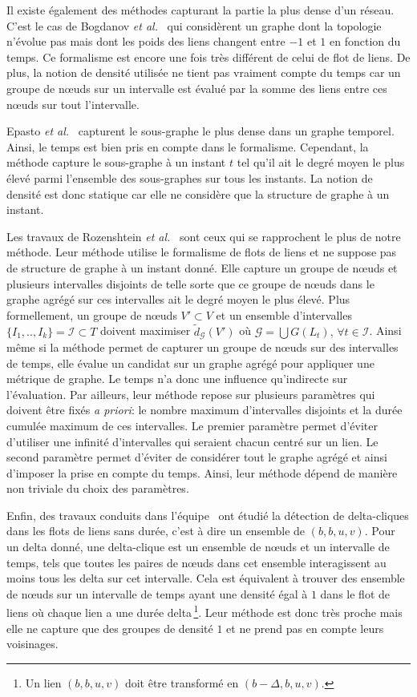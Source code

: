 Il existe également des méthodes capturant la partie la plus dense d'un réseau.
C'est le cas de Bogdanov \emph{et al.}~\cite{Bogdanov2011} qui considèrent un graphe dont la topologie n'évolue pas mais dont les poids des liens changent entre $-1$ et $1$ en fonction du temps.
Ce formalisme est encore une fois très différent de celui de flot de liens.
De plus, la notion de densité utilisée ne tient pas vraiment compte du temps car un groupe de n\oe{}uds sur un intervalle est évalué par la somme des liens entre ces n\oe{}uds sur tout l'intervalle.


Epasto \emph{et al.}~\cite{Epasto2015} capturent le sous-graphe le plus dense dans un graphe temporel.
Ainsi, le temps est bien pris en compte dans le formalisme.
Cependant, la méthode capture le sous-graphe à un instant $t$ tel qu'il ait le degré moyen le plus élevé parmi l'ensemble des sous-graphes sur tous les instants.
La notion de densité est donc statique car elle ne considère que la structure de graphe à un instant.


Les travaux de Rozenshtein \emph{et al.}~\cite{rozenshtein2014} sont ceux qui se rapprochent le plus de notre méthode.
Leur méthode utilise le formalisme de flots de liens et ne suppose pas de structure de graphe à un instant donné.
Elle capture un groupe de n\oe{}uds et plusieurs intervalles disjoints de telle sorte que ce groupe de n\oe{}uds dans le graphe agrégé sur ces intervalles ait le degré moyen le plus élevé.
Plus formellement, un groupe de n\oe{}uds $V'\subset V$ et un ensemble d'intervalles $\{I_1,..,I_k\} = \mathcal{I} \subset T$ doivent maximiser $\tilde{d}_\mathcal{G}(V')$ où $\mathcal{G}= \bigcup G(L_t),\,\forall t \in \mathcal{I}$.
Ainsi même si la méthode permet de capturer un groupe de n\oe{}uds sur des intervalles de temps, elle évalue un candidat sur un graphe agrégé pour appliquer une métrique de graphe.
Le temps n'a donc une influence qu'indirecte sur l'évaluation.
Par ailleurs, leur méthode repose sur plusieurs paramètres qui doivent être fixés \emph{a priori}: le nombre maximum d'intervalles disjoints et la durée cumulée maximum de ces intervalles.
Le premier paramètre permet d'éviter d'utiliser une infinité d'intervalles qui seraient chacun centré sur un lien.
Le second paramètre permet d'éviter de considérer tout le graphe agrégé et ainsi d'imposer la prise en compte du temps.
Ainsi, leur méthode dépend de manière non triviale du choix des paramètres.

Enfin, des travaux conduits dans l'équipe~\cite{viard:hal-01208330,Viard2016} ont étudié la détection de delta-cliques dans les flots de liens sans durée, c'est à dire un ensemble de $(b,b,u,v)$.
Pour un delta donné, une delta-clique est un ensemble de n\oe{}uds et un intervalle de temps, tels que toutes les paires de n\oe{}uds dans cet ensemble interagissent au moins tous les delta sur cet intervalle.
Cela est équivalent à trouver des ensemble de n\oe{}uds sur un intervalle de temps ayant une densité égal à $1$ dans le flot de liens où chaque lien a une durée delta\,\footnote{Un lien $(b,b,u,v)$ doit être transformé en $(b-\Delta,b,u,v)$.}.
Leur méthode est donc très proche mais elle ne capture que des groupes de densité $1$ et ne prend pas en compte leurs voisinages.


